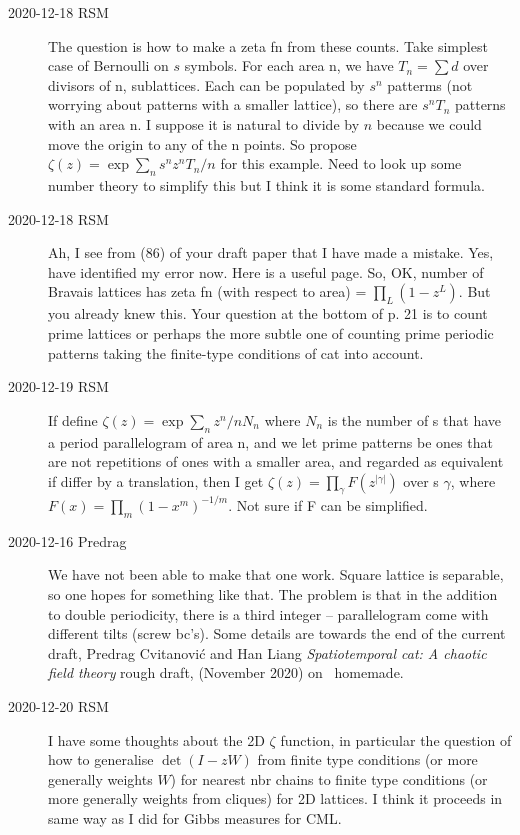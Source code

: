 \begin{description}
\item[2020-12-18 RSM]
The question is how to make a zeta fn from these counts.  Take simplest
case of Bernoulli on ${s}$ symbols.  For each area n, we have $T_n = \sum d$
over divisors of n, sublattices.  Each can be populated by ${s}^n$ patterms
(not worrying about patterns with a smaller lattice), so there are ${s}^n
T_n$ patterns with an area n.  I suppose it is natural to divide by $n$
because we could move the origin to any of the n points.  So propose
\(
\zeta(z)=\exp \sum_n {s}^n z^n T_n/n
\)
for this example.  Need to look up some
number theory to simplify this but I think it is some standard formula.

\item[2020-12-18 RSM]
Ah, I see from (86) of your draft paper that I have made a mistake.  Yes,
have identified my error now. Here is
{a useful page}.
So, OK, number of Bravais lattices has zeta fn (with respect to area) =
$\prod_L (1-z^L)$.  But you already knew this.  Your question at the bottom
of p. 21 is to count prime lattices or perhaps the more subtle one of
counting prime periodic patterns taking the finite-type conditions of
{\spt} cat into account.

\item[2020-12-19 RSM]
If define $\zeta(z)=\exp \sum_n z^n/n N_n$ where $N_n$ is the number of
{\lattstate}s that have a period parallelogram of area n, and we let
prime patterns be ones that are not repetitions of ones with a smaller
area, and regarded as equivalent if differ by a translation, then I get
\(
\zeta(z) = \prod_\gamma F(z^{|\gamma|})
\)
over {\orbit}s $\gamma$, where $F(x) = \prod_m (1-x^m)^{-1/m}$. Not
sure if F can be simplified.

\item[2020-12-16 Predrag]
We have not been able to make that one work. Square lattice is separable,
so one hopes for something like that. The problem is that in the addition
to double periodicity, there is a third integer – parallelogram come with
different tilts (screw bc's). Some details are towards the end of the
current draft,
	Predrag Cvitanovi\'c and Han Liang \emph{Spatiotemporal cat: A
chaotic field theory} rough draft, (November 2020) on
{\spt\ homemade}.

\item[2020-12-20 RSM]
I have some thoughts about the 2D $\zeta$ function, in particular the
question of how to generalise $\det (I-zW)$ from finite type conditions
(or more generally weights $W$) for nearest nbr chains to finite type
conditions (or more generally weights from cliques) for 2D lattices.  I
think it proceeds in same way as I did for Gibbs measures for CML.


\end{description}
